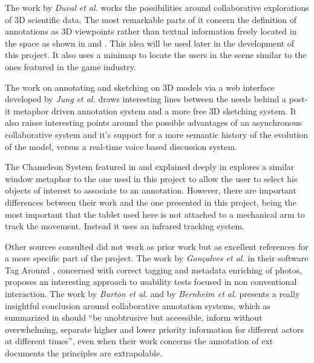 The work by {\em Duval et al.} \cite{Duval} works the possibilities around collaborative explorations of 3D scientific data. The most remarkable parts of it concern the definition of annotations as 3D viewpoints rather than textual information freely located in the space as shown in \cite{Kadobayashi} and \cite{Sonnet}. This idea will be used later in the development of this project. It also uses a minimap to locate the users in the scene similar to the ones featured in the game industry.

The work on annotating and sketching on 3D models via a web interface developed by {\em Jung et al.} \cite{Jung} draws interesting lines between the needs behind a post-it metaphor driven annotation system and a more free 3D sketching system. It also raises interesting points around the possible advantages of an asynchronous collaborative system and it's support for a more semantic history of the evolution of the model, versus a real-time voice based discussion system.

The Chameleon System featured in \cite{3DUI} and explained deeply in \cite{Tsang} explores a similar window metaphor to the one used in this project to allow the user to select his objects of interest to associate to an annotation. However, there are important differences between their work and the one presented in this project, being the most important that the tablet used here is not attached to a mechanical arm to track the movement. Instead it uses an infrared tracking system.

Other sources consulted did not work as prior work but as excellent references for a more specific part of the project. The work by {\em Gonçalves et al.} in their software Tag Around \cite{Goncalves}, concerned with correct tagging and metadata enriching of photos, proposes an interesting approach to usability tests focused in non conventional interaction. The work by {\em Burton et al.}\cite{Burton} and by {\em Bernheim et al.}\cite{Bernheim} presents a really insightful conclusion around collaborative annotation systems, which as summarized in \cite{Jung} should ``be unobtrusive but accessible, inform without overwhelming, separate higher and lower priority information for different actors at different times'', even when their work concerns the annotation of ext documents the principles are extrapolable.
